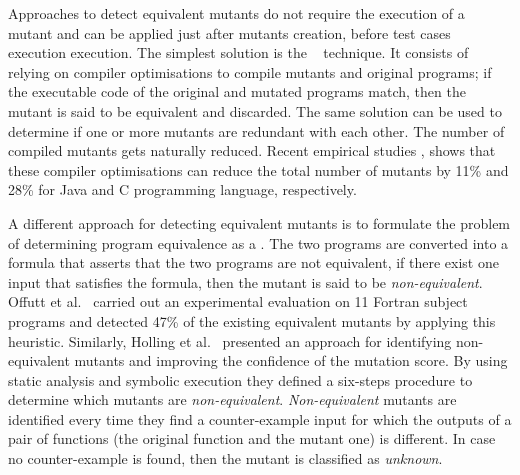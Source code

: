 Approaches to detect equivalent mutants do not require the execution of a mutant and can be applied just after mutants creation, before test cases execution execution. The simplest solution is the ~\cite{papadakis2015trivial, kintis2017detecting,papadakis2019mutation} technique. 
It consists of relying on compiler optimisations to compile mutants and original programs; if the executable code of the original and mutated programs match, then the mutant is said to be equivalent and discarded. The same solution can be used to determine if one or more mutants are redundant with each other. The number of compiled mutants gets naturally reduced. Recent empirical studies \cite{kintis2017detecting}, shows that these compiler optimisations can reduce the total number of mutants by 11\% and 28\% for Java and C programming language, respectively.

A different approach for detecting equivalent mutants is to formulate the problem of determining program equivalence as a . 
The two programs are converted into a formula that asserts that the two programs are not equivalent, if there exist one input that satisfies the formula, then the mutant is said to be \textit{non-equivalent}.
Offutt et al.~\cite{offutt1996detecting,offutt1997automatically} carried out an experimental evaluation on 11 Fortran subject programs and detected 47\% of the existing equivalent mutants by applying this heuristic.
Similarly, Holling et al.~\cite{holling2016nequivack,papadakis2012mutation} presented an approach for identifying non-equivalent mutants and improving the confidence of the mutation score. By using static analysis and symbolic execution they defined a six-steps procedure to determine which mutants are \textit{non-equivalent}. \textit{Non-equivalent} mutants are identified every time they find a counter-example input for which the outputs of a pair of functions (the original function and the mutant one) is different. In case no counter-example is found, then the mutant is classified as \textit{unknown}. 

